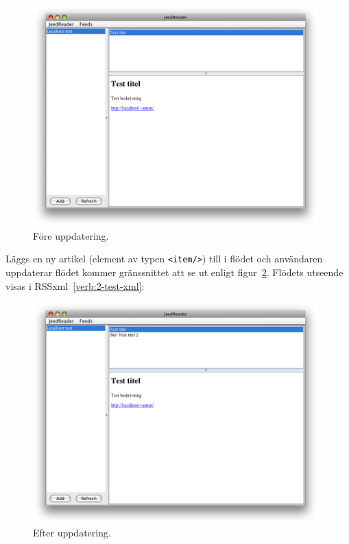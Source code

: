 \documentclass[titlepage, twoside, a4paper, 12pt]{article}
\begin{document}
\begin{figure}[!hbp]
  \begin{center}
    \includegraphics[width=110mm]{images/update-test1-out.png}
    \caption{Före uppdatering.}
    \label{fig:update-test1-out}
  \end{center}
\end{figure}

Läggs en ny artikel (element av typen \verb!<item/>!) till i flödet
och användaren uppdaterar flödet kommer gränssnittet att se ut enligt
figur~\ref{fig:update-test2-out}. Flödets utseende visas i
RSSxml~\ref{verb:2-test-xml}:

\begin{figure}[!hbp]
  \begin{center}
    \includegraphics[width=110mm]{images/update-test2-out.png}
    \caption{Efter uppdatering.}
    \label{fig:update-test2-out}
  \end{center}
\end{figure}
\end{document}
